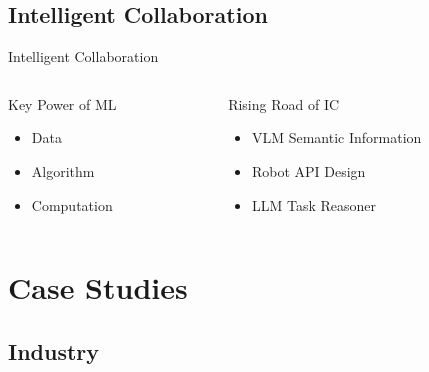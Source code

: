 \documentclass{beamer}
\begin{document}
\subsection{Intelligent Collaboration}
\begin{frame}{Intelligent Collaboration \cite{Ji2024}}

\begin{columns}[onlytextwidth]

\begin{column}{0.5\textwidth}
\centering
\large
Key Power of ML
\footnotesize
\vspace{2mm}
\begin{itemize}
\item Data \cite{naturestatistical, paul2023deeplearningdatadiet, karla2024data}
\vspace{5mm}
\item Algorithm \cite{Blum1998, 7724478, bp}
\vspace{5mm}
\item Computation \cite{kaplan2020scalinglawsneurallanguage}
\end{itemize}
\end{column}

\begin{column}{0.5\textwidth}
\centering
\large
Rising Road of IC
\footnotesize
\vspace{2mm}
\begin{itemize}
\item VLM Semantic Information \cite{radford2021learningtransferablevisualmodels, ravi2024sam2segmentimages}
\vspace{5mm}
\item Robot API Design \cite{vemprala2023gridplatformgeneralrobot, ros}
\vspace{5mm}
\item LLM Task Reasoner \cite{Lin2023, driess2023palmeembodiedmultimodallanguage}
\end{itemize}
\end{column}

\end{columns}
\end{frame}

\section{Case Studies}

\subsection{Industry}
\end{document}
